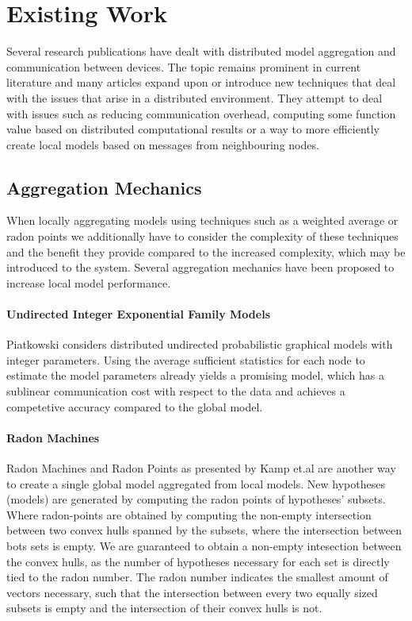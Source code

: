     \section{Existing Work}
    \label{sec:ew}
    Several research publications have dealt with distributed model aggregation and communication between devices. 
    The topic remains prominent in current literature and many articles expand upon or introduce new techniques that deal with the issues that arise in a distributed environment.
    They attempt to deal with issues such as reducing communication overhead, computing some function value based on distributed computational results or a way to more efficiently create local models based on messages from neighbouring nodes. 

    \subsection{Aggregation Mechanics}

    When locally aggregating models using techniques such as a weighted average or radon points we additionally have to consider the complexity of these techniques and the benefit they provide compared to the increased complexity, which may be introduced to the system.
    Several aggregation mechanics have been proposed to increase local model performance.

    \paragraph{Undirected Integer Exponential Family Models}
    Piatkowski \cite{piatkowskidistributed} considers distributed undirected probabilistic graphical models with integer parameters. 
    Using the average sufficient statistics for each node to estimate the model parameters already yields a promising model, which has a sublinear communication cost with respect to the data and achieves a competetive accuracy compared to the global model.
    
    \paragraph{Radon Machines}
    Radon Machines and Radon Points as presented by Kamp et.al \cite{kamp2017effective} are another way to create a single global model aggregated from local models. New hypotheses (models) are generated by computing the radon points of hypotheses' subsets. Where radon-points are obtained by computing the non-empty intersection between two convex hulls spanned by the subsets, where the intersection between bots sets is empty.
    We are guaranteed to obtain a non-empty intesection between the convex hulls, as the number of hypotheses necessary for each set is directly tied to the radon number. 
    The radon number indicates the smallest amount of vectors necessary, such that the intersection between every two equally sized subsets is empty and the intersection of their convex hulls is not.
    
